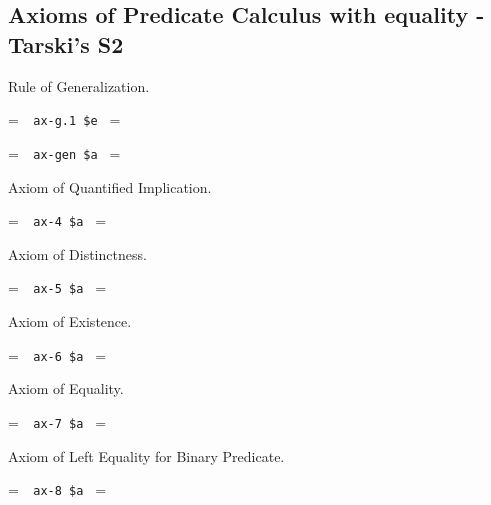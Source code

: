 \subsection{Axioms of Predicate Calculus with equality - Tarski's S2}

\noindent Rule of Generalization.

\setbox\startprefix=\hbox{\tt \ \ ax-g.1\ \$e\ }
\setbox\contprefix=\hbox{\tt \ \ \ \ \ \ \ \ \ \ \ \ }
\startm
\m{\vdash}\m{\varphi}
\endm

\setbox\startprefix=\hbox{\tt \ \ ax-gen\ \$a\ }
\setbox\contprefix=\hbox{\tt \ \ \ \ \ \ \ \ \ \ \ \ }
\startm
\m{\vdash}\m{\forall}\m{\varphi}
\endm

\noindent Axiom of Quantified Implication.

\setbox\startprefix=\hbox{\tt \ \ ax-4\ \$a\ }
\setbox\contprefix=\hbox{\tt \ \ \ \ \ \ \ \ \ \ }
\startm
\m{\vdash}\m{(}\m{\forall}\m{(}\m{\forall}\m{\varphi}\m{\rightarrow}\m{
\psi}\m{)}\m{\rightarrow}\m{(}\m{\forall}\m{\varphi}\m{\rightarrow}\m{
\forall}\m{\psi}\m{)}\m{)}
\endm

\noindent Axiom of Distinctness.

\setbox\startprefix=\hbox{\tt \ \ ax-5\ \$a\ }
\setbox\contprefix=\hbox{\tt \ \ \ \ \ \ \ \ \ \ }
\startm
\m{\vdash}\m{(}\m{\varphi}\m{\rightarrow}\m{\forall}\m{\varphi}\m{)}\m{ }\m{ }\m{ }\m{\varphi}\m{ }\m{(}\m{ }\m{ }\m{ }\m{ }\m{ }\m{\varphi}\m{)}
\endm

\noindent Axiom of Existence.

\setbox\startprefix=\hbox{\tt \ \ ax-6\ \$a\ }
\setbox\contprefix=\hbox{\tt \ \ \ \ \ \ \ \ \ \ }
\startm
\m{\vdash}\m{(}\m{\forall}\m{(}\m{=}\m{\rightarrow}\m{\forall}
\m{\varphi}\m{)}\m{\rightarrow}\m{\varphi}\m{)}
\endm

\noindent Axiom of Equality.

\setbox\startprefix=\hbox{\tt \ \ ax-7\ \$a\ }
\setbox\contprefix=\hbox{\tt \ \ \ \ \ \ \ \ \ \ }
\startm
\m{\vdash}\m{(}\m{=}\m{\rightarrow}\m{(}\m{=}\m{
\rightarrow}\m{=}\m{)}\m{)}
\endm

\noindent Axiom of Left Equality for Binary Predicate.

\setbox\startprefix=\hbox{\tt \ \ ax-8\ \$a\ }
\setbox\contprefix=\hbox{\tt \ \ \ \ \ \ \ \ \ \ \ }
\startm
\m{\vdash}\m{(}\m{=}\m{\rightarrow}\m{(}\m{\in}\m{
\rightarrow}\m{\in}\m{)}\m{)}
\endm

